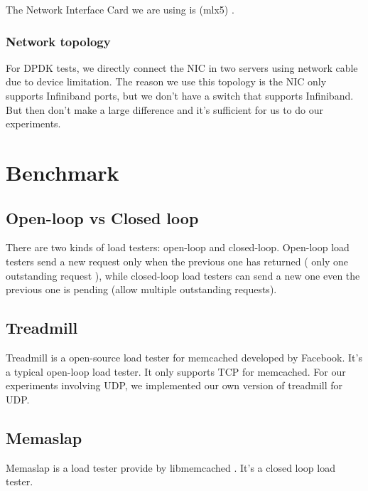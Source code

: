 \documentclass[bsc,frontabs,twoside,singlespacing,parskip,deptreport]{infthesis}     %
\begin{document}
The Network Interface Card we are using is (mlx5) \cite{P1}.


\subsubsection{Network topology}

For DPDK tests, we directly connect the NIC in two servers using network cable due to device limitation. The reason we use this topology is the NIC only supports Infiniband ports, but we don't have a switch that supports Infiniband. But then don't make a large difference and it's sufficient for us to do our experiments.






\section{Benchmark}


\subsection{Open-loop vs Closed loop}

There are two kinds of load testers: open-loop and closed-loop. Open-loop load testers send a new request only when the previous one has returned ( only one outstanding request ), while closed-loop load testers can send a new one even the previous one is pending (allow multiple outstanding requests).



\subsection{Treadmill}

Treadmill \cite{DBLP:conf/isca/ZhangMMT16} is a open-source load tester for memcached developed by Facebook. It's a typical open-loop load tester. It only supports TCP for memcached. For our experiments involving UDP, we implemented our own version of treadmill for UDP. 



\subsection{Memaslap}

Memaslap is a load tester provide by libmemcached \cite{P2}. It's a closed loop load tester.  
\end{document}
